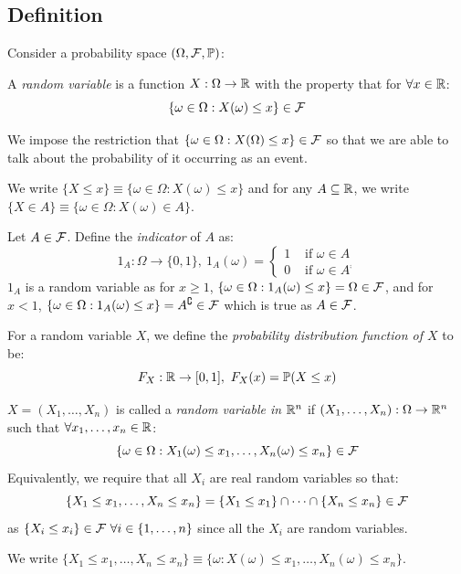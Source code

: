 \documentclass[../main.tex]{subfiles}
\begin{document}
\subsection{Definition}
Consider a probability space $(\Omega, \mathcal{F}, \mathbb{P})$:
\begin{definition}
  A \textit{random variable} is a function $X: \Omega \to \mathbb{R}$ with the property that for $\forall x \in \mathbb{R}$:
  \[
    \{\omega \in \Omega : X(\omega) \leq x\} \in \mathcal{F}
  \]
\end{definition}
We impose the restriction that $\{\omega \in \Omega : X(\Omega) \leq x\} \in \mathcal{F}$ so that we are able to talk about the probability of it occurring as an event.
\begin{remark}[Notation]
  We write $\{X \leq x\} \equiv \{\omega \in \Omega: X(\omega) \leq x\}$ and for any $A \subseteq \mathbb{R}$, we write $\{X \in A\} \equiv \{\omega \in \Omega: X(\omega) \in A\}$.
\end{remark}
\begin{example}
  Let $A \in \mathcal{F}$.
  \label{indicatorFunction}
  Define the \textit{indicator} of $A$ as:
  \[
    1_A: \Omega \to \{0, 1\},\ 1_A(\omega) = \begin{cases}
      1 & \text{ if } \omega \in A \\
      0 & \text{ if } \omega \in A^{\comp}
    \end{cases}
  \]
  $1_A$ is a random variable as for $x \geq 1$, $\{\omega \in \Omega: 1_A(\omega) \leq x\} = \Omega \in \mathcal{F}$, and for $x < 1$, $\{\omega \in \Omega: 1_A(\omega) \leq x\} = A^{\complement} \in \mathcal{F}$ which is true as $A \in \mathcal{F}$.
\end{example}
\begin{definition}
  For a random variable $X$, we define the \textit{probability distribution function of $X$} to be:
  \label{pdfDefinition}
  \[
    F_X: \mathbb{R} \to [0, 1],\  F_X(x) = \mathbb{P}(X \leq x)
  \]
\end{definition}
\begin{definition}
  $X = (X_1, \ldots, X_n)$ is called a \textit{random variable in $\mathbb{R}^{n}$} if $(X_1, \ldots, X_n): \Omega \to \mathbb{R}^{n}$ such that $\forall x_1, \ldots, x_n \in \mathbb{R}$:
  \[
    \{\omega \in \Omega: X_1(\omega) \leq x_1, \ldots, X_n(\omega) \leq x_n\} \in \mathcal{F}
  \]
  Equivalently, we require that all $X_i$ are real random variables so that:
  \[
    \{X_1 \leq x_1, \ldots, X_n \leq x_n\} = \{X_1 \leq x_1\} \cap \cdots \cap \{X_n \leq x_n\} \in \mathcal{F}
  \]
  as $\{X_i \leq x_i\} \in \mathcal{F}\ \forall i \in \{1, \ldots, n\}$ since all the $X_i$ are random variables.
\end{definition}
\begin{remark}[Notation]
  We write $\{X_1 \leq x_1, \ldots, X_n \leq x_n\} \equiv \{\omega: X(\omega) \leq x_1, \ldots, X_n(\omega) \leq x_n\}$.
\end{remark}
\end{document}
